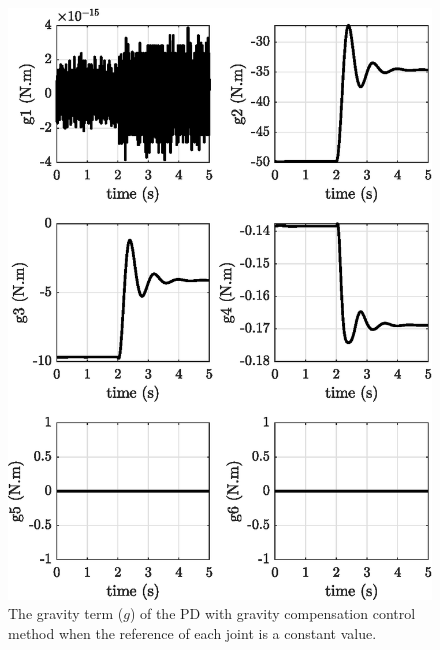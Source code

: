 \begin{figure}[H]
	\centering
	\includegraphics{images/act_1.6_step/g.eps}
	\caption{The gravity term ($g$) of the PD with gravity compensation control method when the reference of each joint is a constant value.}
	\label{fig:act_1.6_step_g}
\end{figure}



\newpage
